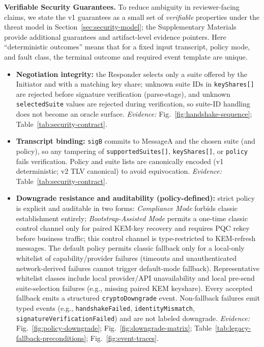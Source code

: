 \documentclass[10pt,journal,compsoc]{IEEEtran}
\providecommand{\tightlist}{%
  \setlength{\itemsep}{0pt}\setlength{\parskip}{0pt}}
\newcommand{\nbcode}[1]{\mbox{\texttt{#1}}}
\begin{document}
\textbf{Verifiable Security Guarantees.}
To reduce ambiguity in reviewer-facing claims, we state the v1 guarantees
as a small set of \emph{verifiable} properties under the threat model in
Section~\ref{sec:security-model}; the Supplementary Materials provide
additional guarantees and artifact-level evidence pointers.
Here ``deterministic outcomes'' means that for a fixed input transcript,
policy mode, and fault class, the terminal outcome and required event
template are unique.
{\small
\begin{itemize}\tightlist
\item \textbf{Negotiation integrity:} the Responder selects only a suite
  offered by the Initiator and with a matching key share; unknown suite
  IDs in \nbcode{keyShares[]} are rejected before signature verification
  (parse-stage), and unknown
  \texttt{selectedSuite} values are rejected during verification, so
  suite-ID handling does not become an oracle surface.
  \textit{Evidence:} Fig.~\ref{fig:handshake-sequence};
  Table~\ref{tab:security-contract}.
\item \textbf{Transcript binding:} \texttt{sigB} commits to MessageA and
  the chosen suite (and policy), so any tampering of
  \nbcode{supportedSuites[]}, \nbcode{keyShares[]}, or \texttt{policy}
  fails verification. Policy and suite lists are canonically encoded
  (v1 deterministic; v2 TLV canonical) to avoid equivocation.
  \textit{Evidence:} Table~\ref{tab:security-contract}.
\item \textbf{Downgrade resistance and auditability (policy-defined):} strict policy is
  explicit and auditable in two forms: \emph{Compliance Mode} forbids
  classic establishment entirely; \emph{Bootstrap-Assisted Mode} permits
  a one-time classic control channel only for paired KEM-key recovery
  and requires PQC rekey before business traffic; this control channel is
  type-restricted to KEM-refresh messages. The default policy
  permits classic fallback only for a local-only whitelist of
  capability/provider failures (timeouts and unauthenticated
  network-derived failures cannot trigger default-mode fallback).
  Representative whitelist classes include local provider/API
  unavailability and local pre-send suite-selection failures (e.g.,
  missing paired KEM keyshare). Every accepted fallback emits a
  structured \texttt{cryptoDowngrade} event. Non-fallback failures emit
  typed events (e.g., \texttt{handshakeFailed},
  \texttt{identityMismatch}, \texttt{signatureVerificationFailed}) and
  are not labeled downgrade.
  \textit{Evidence:} Fig.~\ref{fig:policy-downgrade}; Fig.~\ref{fig:downgrade-matrix};
  Table~\ref{tab:legacy-fallback-preconditions};
  Fig.~\ref{fig:event-traces}.
\end{itemize}
}
\end{document}
